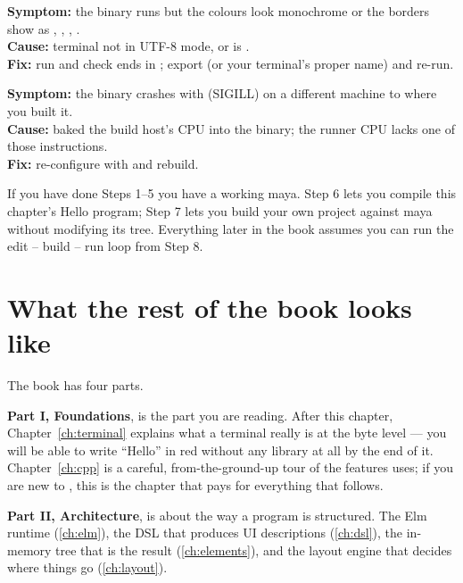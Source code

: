 \begin{warning}
\textbf{Symptom:} the binary runs but the colours look monochrome
or the borders show as , , , .\\
\textbf{Cause:} terminal not in UTF-8 mode, or  is
.\\
\textbf{Fix:} run  and check  ends in
; export  (or your terminal's
proper name) and re-run.
\end{warning}

\begin{warning}
\textbf{Symptom:} the binary crashes with 
(SIGILL) on a different machine to where you built it.\\
\textbf{Cause:}  baked the build host's CPU
into the binary; the runner CPU lacks one of those instructions.\\
\textbf{Fix:} re-configure with 
and rebuild.
\end{warning}

\begin{recap}
If you have done Steps 1--5 you have a working maya. Step 6 lets
you compile this chapter's Hello program; Step 7 lets you build
your own project against maya without modifying its tree.
Everything later in the book assumes you can run the edit -- build
-- run loop from Step 8.
\end{recap}

\section{What the rest of the book looks like}

The book has four parts.

\textbf{Part I, Foundations}, is the part you are reading. After this
chapter, Chapter~\ref{ch:terminal} explains what a terminal really is
at the byte level --- you will be able to write ``Hello'' in red
without any library at all by the end of it. Chapter~\ref{ch:cpp} is
a careful, from-the-ground-up tour of the \cpp{} features \maya{}
uses; if you are new to \cpp{}, this is the chapter that pays for
everything that follows.

\textbf{Part II, Architecture}, is about the way a \maya{} program is
structured. The Elm runtime (\ref{ch:elm}), the DSL that produces
UI descriptions (\ref{ch:dsl}), the in-memory tree that is the result
(\ref{ch:elements}), and the layout engine that decides where things
go (\ref{ch:layout}).

